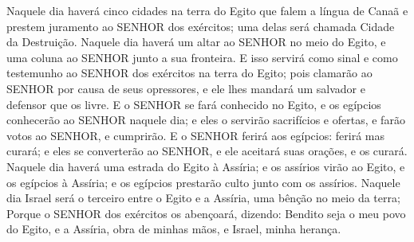 {Naquele dia haverá cinco cidades na terra do Egito que falem a língua de Canaã e prestem juramento ao SENHOR dos exércitos; uma delas será chamada Cidade da Destruição.
Naquele dia haverá um altar ao SENHOR no meio do Egito, e uma coluna ao SENHOR junto a sua fronteira.
E isso servirá como sinal e como testemunho ao SENHOR dos exércitos na terra do Egito; pois clamarão ao SENHOR por causa de seus opressores, e ele lhes mandará um salvador e defensor que os livre.
E o SENHOR se fará conhecido no Egito, e os egípcios conhecerão ao SENHOR naquele dia; e eles o servirão
{} sacrifícios e ofertas, e farão votos ao SENHOR, e
{} cumprirão.
E o SENHOR ferirá aos egípcios: ferirá mas
{} curará; e eles se converterão ao SENHOR, e ele aceitará suas orações, e os curará.
Naquele dia haverá uma estrada do Egito à Assíria; e os assírios virão ao Egito, e os egípcios à Assíria; e os egípcios prestarão culto junto com os assírios.
Naquele dia Israel será o terceiro entre o Egito e a Assíria, uma bênção no meio da terra;
Porque o SENHOR dos exércitos os abençoará, dizendo: Bendito seja o meu povo do Egito, e a Assíria, obra de minhas mãos, e Israel, minha herança.

\par }
